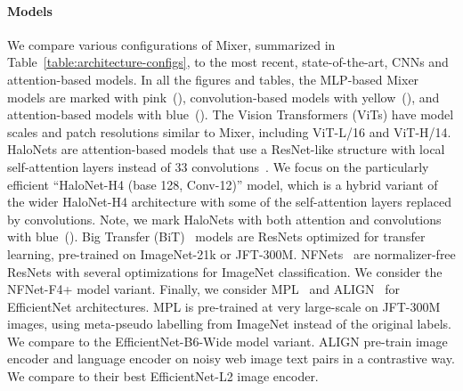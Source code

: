 \documentclass{article}
\newcommand{\MDot}{\raisebox{0.5pt}{\tikz\fill[mixer] (0,0) circle (.5ex);}}
\newcommand{\CDot}{\raisebox{0.5pt}{\tikz\fill[cnn] (0,0) circle (.5ex);}}
\newcommand{\ADot}{\raisebox{0.5pt}{\tikz\fill[attention] (0,0) circle (.5ex);}}
\newcommand{\name}{Mixer}
\begin{document}
\paragraph{Models}
We compare various configurations of \name{}, summarized in Table~\ref{table:architecture-configs}, to the most recent, state-of-the-art, CNNs and attention-based models.
In all the figures and tables, 
the MLP-based \name{} models are marked with pink~(\MDot{}),
convolution-based models with yellow~(\CDot{}), 
and attention-based models with blue~(\ADot{}).
The Vision Transformers (ViTs) have model scales and patch resolutions similar to \name{}, including ViT-L/16 and ViT-H/14.
HaloNets are attention-based models that use a ResNet-like structure with local self-attention layers instead of 33 convolutions~\citep{vaswani2021scaling}.
We focus on the particularly efficient ``HaloNet-H4 (base 128, Conv-12)'' model, which is a hybrid variant of the wider HaloNet-H4 architecture with some of the self-attention layers replaced by convolutions.
Note, we mark HaloNets with both attention and convolutions with blue~(\ADot{}).
Big Transfer (BiT)~\citep{kolesnikov2020-bit} models are ResNets optimized for transfer learning, pre-trained on ImageNet-21k or JFT-300M.
NFNets~\citep{brock2021high} are normalizer-free ResNets with several optimizations for ImageNet classification.
We consider the NFNet-F4+ model variant.
Finally, we consider MPL~\citep{pham2020meta} and ALIGN~\citep{jia2021scaling} for EfficientNet architectures. MPL is pre-trained at very large-scale on JFT-300M images, using meta-pseudo labelling from ImageNet instead of the original labels. We compare to the EfficientNet-B6-Wide model variant. ALIGN pre-train image encoder and language encoder on noisy web image text pairs in a contrastive way. We compare to their best EfficientNet-L2 image encoder.
\end{document}
